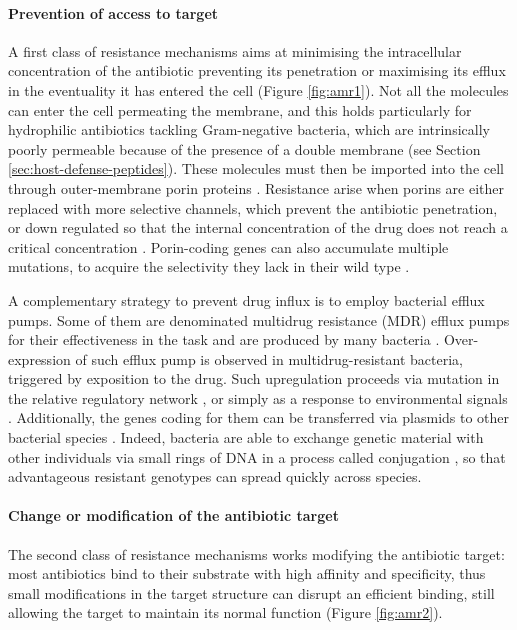 \paragraph{Prevention of access to target}
A first class of resistance mechanisms aims at minimising the intracellular concentration of the antibiotic preventing its penetration or maximising its efflux in the eventuality it has entered the cell (Figure \ref{fig:amr1}).
%
Not all the molecules can enter the cell permeating the membrane, and this holds particularly for hydrophilic antibiotics tackling Gram-negative bacteria, which are intrinsically poorly permeable because of the presence of a double membrane \citep{Delcour2009} (see Section \ref{sec:host-defense-peptides}).
%
These molecules must then be imported into the cell through outer-membrane porin proteins \citep{Vargiu2012,Kojima2013}. Resistance arise when porins are either replaced with more selective channels, which prevent the antibiotic penetration, or down regulated so that the internal concentration of the drug does not reach a critical concentration \citep{Lavigne2013}. Porin-coding genes can also accumulate multiple mutations, to acquire the selectivity they lack in their wild type \citep{Poulou2013}.

A complementary strategy to prevent drug influx is to employ bacterial efflux pumps. Some of them are denominated multidrug resistance (MDR) efflux pumps for their effectiveness in the task and are produced by many bacteria \citep{Floyd2010,Ogawa2012}.
%
Over-expression of such efflux pump is observed in multidrug-resistant bacteria, triggered by exposition to the drug. Such upregulation proceeds via mutation in the relative regulatory network \citep{Abouzeed2008}, or simply as a response to environmental signals \citep{Nikaido2011}.
%
Additionally, the genes coding for them can be transferred via plasmids to other bacterial species \citep{Dolejska2013}. Indeed, bacteria are able to exchange genetic material with other individuals via small rings of DNA in a process called conjugation \citep{Sorensen2005}, so that advantageous resistant genotypes can spread quickly across species.


\paragraph{Change or modification of the antibiotic target}
The second class of resistance mechanisms works modifying the antibiotic target: most antibiotics bind to their substrate with high affinity and specificity, thus small modifications in the target structure can disrupt an efficient binding, still allowing the target to maintain its normal function (Figure \ref{fig:amr2}).

